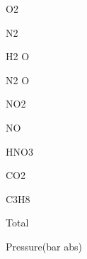 \documentclass[a4paper,portrait,12pt]{article}
\begin{document}
\begin{flushleft}
O2
\end{flushleft}





\begin{flushleft}
N2
\end{flushleft}





\begin{flushleft}
H2 O
\end{flushleft}





\begin{flushleft}
N2 O
\end{flushleft}





\begin{flushleft}
NO2
\end{flushleft}





\begin{flushleft}
NO
\end{flushleft}





\begin{flushleft}
HNO3
\end{flushleft}





\begin{flushleft}
CO2
\end{flushleft}





\begin{flushleft}
C3H8
\end{flushleft}





\begin{flushleft}
Total
\end{flushleft}





\begin{flushleft}
Pressure(bar abs)
\end{flushleft}
\end{document}
